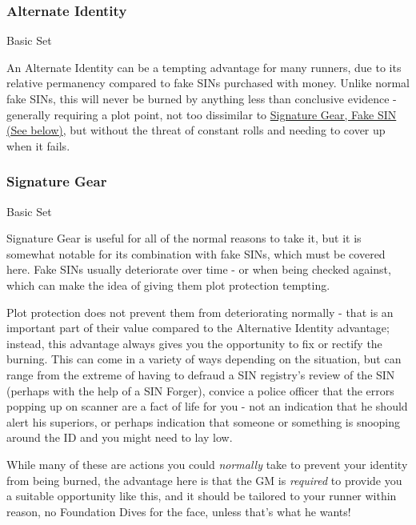 \begin{multicols*}{3}
	\subsubsection*{Alternate Identity}\label{alternate_identity}
	\begin{flushright}
		Basic Set 
	\end{flushright}
	
	An Alternate Identity can be a tempting advantage for many runners, due to its relative permanency compared to fake SINs purchased with money. Unlike normal fake SINs, this will never be burned by anything less than conclusive evidence - generally requiring a plot point, not too dissimilar to \hyperref[signature_gear]{Signature Gear, Fake SIN (See below)}, but without the threat of constant rolls and needing to cover up when it fails.
	
	
	\subsubsection*{Signature Gear}\label{signature_gear}
	\begin{flushright}
		Basic Set 
	\end{flushright}
	
	Signature Gear is useful for all of the normal reasons to take it, but it is somewhat notable for its combination with fake SINs, which must be covered here. Fake SINs usually deteriorate over time - or when being checked against, which can make the idea of giving them plot protection tempting.
	
	Plot protection does not prevent them from deteriorating normally - that is an important part of their value compared to the Alternative Identity advantage; instead, this advantage always gives you the opportunity to fix or rectify the burning. This can come in a variety of ways depending on the situation, but can range from the extreme of having to defraud a SIN registry's review of the SIN (perhaps with the help of a SIN Forger), convice a police officer that the errors popping up on scanner are a fact of life for you - not an indication that he should alert his superiors, or perhaps indication that someone or something is snooping around the ID and you might need to lay low.
	
	While many of these are actions you could \textit{normally} take to prevent your identity from being burned, the advantage here is that the GM is \textit{required} to provide you a suitable opportunity like this, and it should be tailored to your runner within reason, no Foundation Dives for the face, unless that's what he wants!
	

\end{multicols*}
